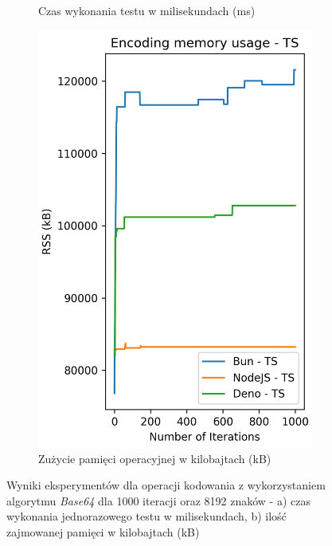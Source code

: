 \begin{figure}[H]
\begin{subfigure}[b]{0.44\textwidth}
    \caption{Czas wykonania testu w milisekundach (ms)}
    \label{fig:encoding_e2_ts_time}
  \end{subfigure}
  \begin{subfigure}[b]{0.44\textwidth}
    \centering
    \includegraphics[width=\textwidth]{Figures/coding/base64_1000_encoding_ts_memory.png}
    \caption{Zużycie pamięci operacyjnej w kilobajtach (kB)}
    \label{fig:encoding_e2_ts_memory}
  \end{subfigure}
  \hfill
  \caption{Wyniki eksperymentów dla operacji kodowania z wykorzystaniem algorytmu \textit{Base64} dla 1000 iteracji oraz 8192 znaków - a) czas wykonania jednorazowego testu w milisekundach, b) ilość zajmowanej pamięci w kilobajtach (kB)}
  \label{fig:encoding_e2_ts}
\end{figure}

